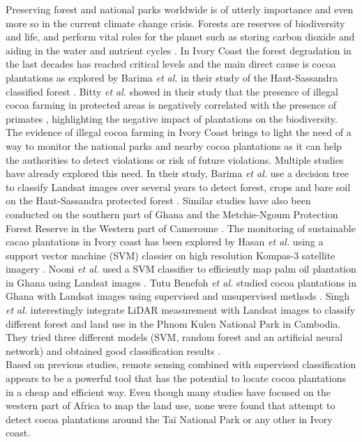 \documentclass[a4paper, 12pt]{article}
\begin{document}
    Preserving forest and national parks worldwide is of utterly importance and even more so in the current climate change crisis. Forests are reserves of biodiversity and life, and perform vital roles for the planet such as storing carbon dioxide and aiding in the water and nutrient cycles \cite{grassi_key_2017, houghton_role_2015}. In Ivory Coast the forest degradation in the last decades has reached critical levels and the main direct cause is cocoa plantations as explored by Barima \textit{et al.} in their study of the Haut-Sassandra classified forest \cite{barima_cocoa_2016}. Bitty \textit{et al.} showed in their study that the presence of illegal cocoa farming in protected areas is negatively correlated with the presence of primates \cite{bitty_cocoa_2015}, highlighting the negative impact of plantations on the biodiversity. The evidence of illegal cocoa farming in Ivory Coast \cite{barima_cocoa_2016} brings to light the need of a way to monitor the national parks and nearby cocoa plantations as it can help the authorities to detect violations or risk of future violations. Multiple studies have already explored this need. In their study, Barima \textit{et al.} use a decision tree to classify Landsat images over several years to detect forest, crops and bare soil on the Haut-Sassandra protected forest \cite{barima_cocoa_2016}. Similar studies have also been conducted on the southern part of Ghana \cite{koranteng_remote_nodate} and the Metchie-Ngoum Protection Forest Reserve in the Western part of Cameroune \cite{meli_fokeng_multi-temporal_2019}. The monitoring of sustainable cacao plantations in Ivory coast has been explored by Hasan \textit{et al.} using a support vector machine (SVM) classier on high resolution Kompas-3 satellite imagery \cite{hasan_remote_2018}. Nooni \textit{et al.} used a SVM classifier to efficiently map palm oil plantation in Ghana using Landsat images \cite{nooni_support_2014}. Tutu Benefoh \textit{et al.} studied cocoa plantations in Ghana with Landsat images using supervised and unsupervised methods \cite{tutu_benefoh_assessing_2018}. Singh \textit{et al.} interestingly integrate LiDAR measurement with Landsat images to classify different forest and land use in the Phnom Kulen National Park in Cambodia. They tried three different models (SVM, random forest and an artificial neural network) and obtained good classification results \cite{singh_evaluating_2019}.
    \\
    Based on previous studies, remote sensing combined with supervised classification appears to be a powerful tool that has the potential to locate cocoa plantations in a cheap and efficient way. Even though many studies have focused on the western part of Africa to map the land use, none were found that attempt to detect cocoa plantations around the Taï National Park or any other in Ivory coast.
\end{document}
